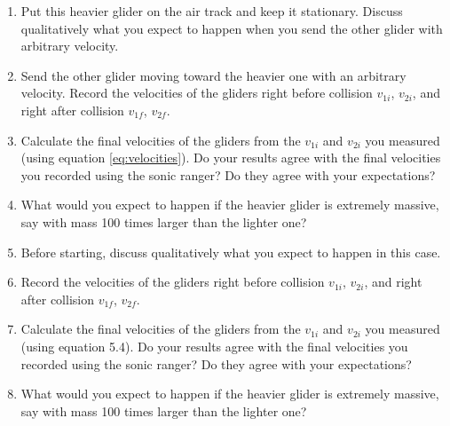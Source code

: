 \begin{enumerate}
\item Put this heavier glider on the air track and keep it stationary. Discuss qualitatively what you expect to happen when you send the other glider with arbitrary velocity.

\item  Send the other glider moving toward the heavier one with an arbitrary velocity. Record the velocities of the gliders right before collision $v_{1i}$, $v_{2i}$, and right after collision $v_{1f}$, $v_{2f}$.

    \item Calculate the final velocities of the gliders from the $v_{1i}$ and $v_{2i}$ you measured (using equation \ref{eq:velocities}). Do your results agree with the final velocities you recorded using the sonic ranger? Do they agree with your expectations?
    \item What would you expect to happen if the heavier glider is extremely massive, say with mass 100 times larger than the lighter one?

  \item Before starting, discuss qualitatively what you expect to happen in this case.
  \item Record the velocities of the gliders right before collision $v_{1i}$, $v_{2i}$, and right after collision $v_{1f}$, $v_{2f}$.
    \item Calculate the final velocities of the gliders from the $v_{1i}$ and $v_{2i}$ you measured (using equation 5.4). Do your results agree with the final velocities you recorded using the sonic ranger? Do they agree with your expectations?
    \item What would you expect to happen if the heavier glider is extremely massive, say with mass 100 times larger than the lighter one?
\end{enumerate}

